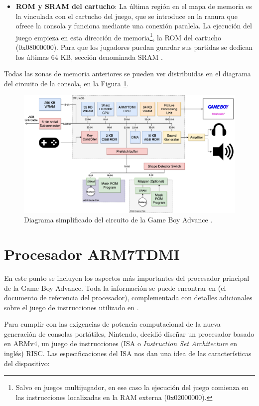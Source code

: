 \begin{itemize}
	\item \textbf{ROM y SRAM del cartucho}: La última región en el mapa de memoria es la vinculada con el cartucho del juego, que se introduce en la ranura que ofrece la consola y funciona mediante una conexión paralela. La ejecución del juego empieza en esta dirección de memoria\footnote{Salvo en juegos multijugador, en ese caso la ejecución del juego comienza en las instrucciones localizadas en la RAM externa (0x02000000).}, la ROM del cartucho (0x08000000). Para que los jugadores puedan guardar sus partidas se dedican los últimas 64 KB, sección denominada SRAM \cite{bib:tonc,bib:gba_manual,bib:gbatek}.
\end{itemize}

Todas las zonas de memoria anteriores se pueden ver distribuidas en el diagrama del circuito de la consola, en la Figura \ref{fig:diagrama}.

\begin{figure}[h]
    \centering
    \includegraphics[width=.9\textwidth]{capitulos/capitulo2/diagram.png}
    \caption{Diagrama simplificado del circuito de la Game Boy Advance \cite{bib:rodrigo}.}
    \label{fig:diagrama}
\end{figure}
\FloatBarrier{}

\section{Procesador ARM7TDMI}
En este punto se incluyen los aspectos más importantes del procesador principal de la Game Boy Advance. Toda la información se puede encontrar en \cite{bib:arm} (el documento de referencia del procesador), complementada con detalles adicionales sobre el juego de instrucciones utilizado en \cite{bib:armv4_isa}.

Para cumplir con las exigencias de potencia computacional de la nueva generación de consolas portátiles, Nintendo, decidió diseñar un procesador basado en ARMv4, un  juego de instrucciones (ISA o \textit{Instruction Set Architecture} en inglés)  RISC. Las especificaciones del ISA nos dan una idea de las características del dispositivo:

